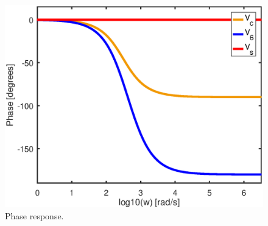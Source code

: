 \begin{figure}[h] \centering
\includegraphics[width=0.6\linewidth]{part6_ang.eps}
\caption{Phase response.}
\label{RC Circuit.}
\end{figure}













